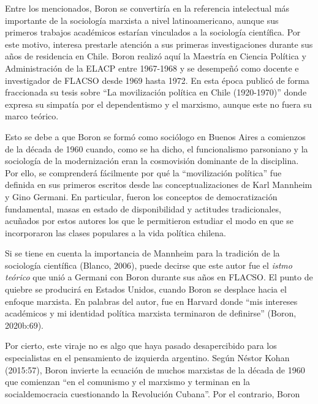 Entre los mencionados, Boron se convertiría en la referencia intelectual más importante de la sociología marxista a nivel latinoamericano, aunque sus primeros trabajos académicos estarían vinculados a la sociología científica. Por este motivo, interesa prestarle atención a sus primeras investigaciones durante sus años de residencia en Chile. Boron realizó aquí la Maestría en Ciencia Política y Administración de la ELACP entre 1967-1968 y se desempeñó como docente e investigador de FLACSO desde 1969 hasta 1972. En esta época publicó de forma fraccionada su tesis sobre ``La movilización política en Chile (1920-1970)'' donde expresa su simpatía por el dependentismo y el marxismo, aunque este no fuera su marco teórico.

Esto se debe a que Boron se formó como sociólogo en Buenos Aires a comienzos de la década de 1960 cuando, como se ha dicho, el funcionalismo parsoniano y la sociología de la modernización eran la cosmovisión dominante de la disciplina. Por ello, se comprenderá fácilmente por qué la ``movilización política'' fue definida en sus primeros escritos desde las conceptualizaciones de Karl Mannheim y Gino Germani. En particular, fueron los conceptos de democratización fundamental, masas en estado de disponibilidad y actitudes tradicionales, acuñados por estos autores los que le permitieron estudiar el modo en que se incorporaron las clases populares a la vida política chilena.

Si se tiene en cuenta la importancia de Mannheim para la tradición de la sociología científica \parencite{278-AMARAL2018,1504-VILA2023}(Blanco, 2006), puede decirse que este autor fue el \emph{istmo teórico} que unió a Germani con Boron durante sus años en FLACSO. El punto de quiebre se producirá en Estados Unidos, cuando Boron se desplace hacia el enfoque marxista. En palabras del autor, fue en Harvard donde ``mis intereses académicos y mi identidad política marxista terminaron de definirse'' (Boron, 2020b:69).

Por cierto, este viraje no es algo que haya pasado desapercibido para los especialistas en el pensamiento de izquierda argentino. Según Néstor Kohan (2015:57), Boron invierte la ecuación de muchos marxistas de la década de 1960 que comienzan ``en el comunismo y el marxismo y terminan en la socialdemocracia cuestionando la Revolución Cubana''. Por el contrario, Boron

